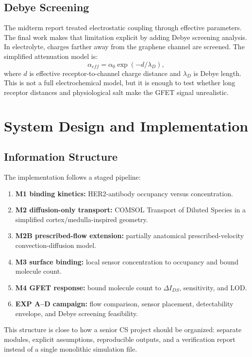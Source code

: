 \documentclass[12pt,a4paper,oneside]{report}
\begin{document}
\section{Debye Screening}

The midterm report treated electrostatic coupling through effective parameters. The final work makes that limitation explicit by adding Debye screening analysis. In electrolyte, charges farther away from the graphene channel are screened. The simplified attenuation model is:
\begin{equation}
\alpha_{eff}=\alpha_0\exp(-d/\lambda_D),
\end{equation}
where \(d\) is effective receptor-to-channel charge distance and \(\lambda_D\) is Debye length. This is not a full electrochemical model, but it is enough to test whether long receptor distances and physiological salt make the GFET signal unrealistic.

\chapter{System Design and Implementation}

\section{Information Structure}

The implementation follows a staged pipeline:

\begin{enumerate}
    \item \textbf{M1 binding kinetics:} HER2-antibody occupancy versus concentration.
    \item \textbf{M2 diffusion-only transport:} COMSOL Transport of Diluted Species in a simplified cortex/medulla-inspired geometry.
    \item \textbf{M2B prescribed-flow extension:} partially anatomical prescribed-velocity convection-diffusion model.
    \item \textbf{M3 surface binding:} local sensor concentration to occupancy and bound molecule count.
    \item \textbf{M4 GFET response:} bound molecule count to \(\Delta I_{DS}\), sensitivity, and LOD.
    \item \textbf{EXP A--D campaign:} flow comparison, sensor placement, detectability envelope, and Debye screening feasibility.
\end{enumerate}

This structure is close to how a senior CS project should be organized: separate modules, explicit assumptions, reproducible outputs, and a verification report instead of a single monolithic simulation file.
\end{document}
